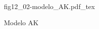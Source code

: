 \begin{figure}[h]
\centering
\def\svgwidth{0.5\textwidth}
{fig12_02-modelo_AK.pdf_tex}
\caption{Modelo AK}
\label{fig12_02-modelo_AK}
\end{figure}